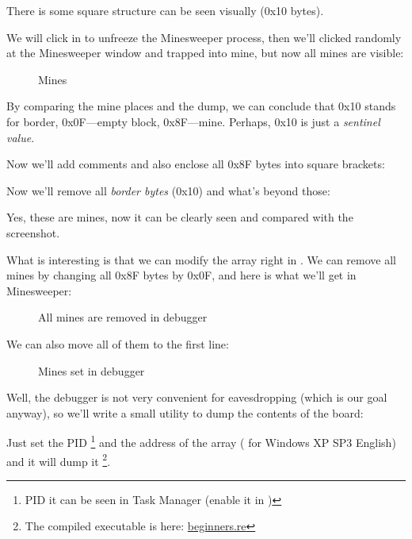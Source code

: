There is some square 
structure can be seen visually (0x10 bytes).

We will click  in \olly to unfreeze the Minesweeper process, then we'll clicked randomly at the Minesweeper window 
and trapped into mine, but now all mines are visible:

\begin{figure}[H]
\centering
{}
\caption{Mines}
\label{fig:minesweeper1}
\end{figure}

By comparing the mine places and the dump, we can conclude that 0x10 stands for border, 0x0F---empty block, 0x8F---mine.
Perhaps, 0x10 is just a \emph{sentinel value}.

Now we'll add comments and also enclose all 0x8F bytes into square brackets:



Now we'll remove all \emph{border bytes} (0x10) and what's beyond those:



Yes, these are mines, now it can be clearly seen and compared with the screenshot.

\clearpage
What is interesting is that we can modify the array right in \olly.
We can remove all mines by changing all 0x8F bytes by 0x0F, and here is what we'll get in Minesweeper:

\begin{figure}[H]
\centering
{}
\caption{All mines are removed in debugger}
\label{fig:minesweeper3}
\end{figure}

We can also move all of them to the first line: 

\begin{figure}[H]
\centering
{}
\caption{Mines set in debugger}
\label{fig:minesweeper2}
\end{figure}

Well, the debugger is not very convenient for eavesdropping (which is our goal anyway), so we'll write a small utility
to dump the contents of the board:



Just set the \ac{PID}
\footnote{PID it can be seen in Task Manager 
(enable it in )} 
and the address of the array ( for Windows XP SP3 English) 
and it will dump it
\footnote{The compiled executable is here: 
\href{http://go.yurichev.com/17165}{beginners.re}}.

